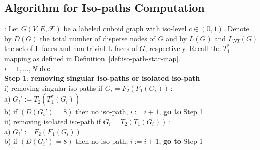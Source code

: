 \documentclass[a4paper,11pt]{article}
\begin{document}
\subsection*{Algorithm for Iso-paths Computation}
: Let $G(V,E,\mathcal{F})$ be a labeled cuboid graph with iso-level $c\in (0,1)$.
Denote by $D(G)$ the total number of disperse nodes of $G$ and by $L(G)$ and $L_{NT}(G)$ the set
of L-faces and non-trivial L-faces of $G$, respectively. Recall the $T_1^*$-mapping as defined in
Definition~\ref{def:iso-path-star-map}.\\

 $i=1,\ldots,N$ {\bf do:}\\
\mbox{}\hspace{0.3cm}    {\bf Step 1}: {\bf removing singular iso-paths or isolated iso-path}\\
\mbox{}\hspace{0.6cm}      i) removing singular iso-paths if $G_i=F_2(F_1(G_i))$\,:\\
\mbox{}\hspace{1.1cm}         a) $G_i':=T_2(T_1^*(G_i))$\\
\mbox{}\hspace{1.1cm}         b) if $(D(G_i')=8)$ then no iso-path, $i:=i+1$, {\bf go to} Step 1\\
\mbox{}\hspace{0.6cm}      ii) removing isolated iso-path if $G_i=T_2(T_1(G_i))$\,:\\
\mbox{}\hspace{1.1cm}         a) $G_i':=F_2(F_1(G_i))$\\
\mbox{}\hspace{1.1cm}         b) if $(D(G_i')=8)$ then no iso-path, $i:=i+1$, {\bf go to} Step 1\\
\end{document}
